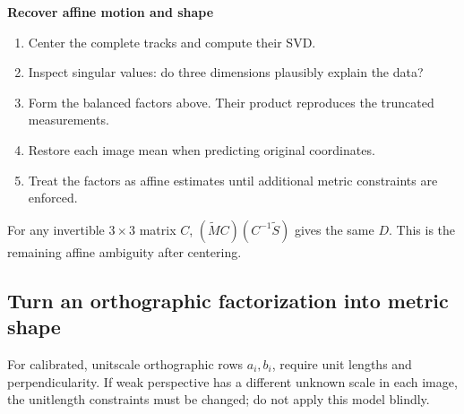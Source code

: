 \documentclass[letterpaper,11pt,english,openany,oneside]{jupyterBook}
\begin{document}
\begin{TextbookBox}
\textbf{Recover affine motion and shape}\par\smallskip
\begin{enumerate}
%
\item {}
\sphinxAtStartPar
Center the complete tracks and compute their SVD.

\item {}
\sphinxAtStartPar
Inspect singular values: do three dimensions plausibly explain the data?

\item {}
\sphinxAtStartPar
Form the balanced factors above. Their product reproduces the truncated measurements.

\item {}
\sphinxAtStartPar
Restore each image mean when predicting original coordinates.

\item {}
\sphinxAtStartPar
Treat the factors as affine estimates until additional metric constraints are enforced.

\end{enumerate}

\end{TextbookBox}

\sphinxAtStartPar
For any invertible \(3\times3\) matrix \(C\), \((\widetilde MC)(C^{-1}\widetilde S)\) gives the same \(D\). This is the remaining affine ambiguity after centering.


\subsection{Turn an orthographic factorization into metric shape}
\label{\detokenize{lectures/lecture06/factorization:turn-an-orthographic-factorization-into-metric-shape}}
\sphinxAtStartPar
For calibrated, unit\sphinxhyphen{}scale orthographic rows \(a_i,b_i\), require unit lengths and perpendicularity. If weak perspective has a different unknown scale in each image, the unit\sphinxhyphen{}length constraints must be changed; do not apply this model blindly.
\end{document}
